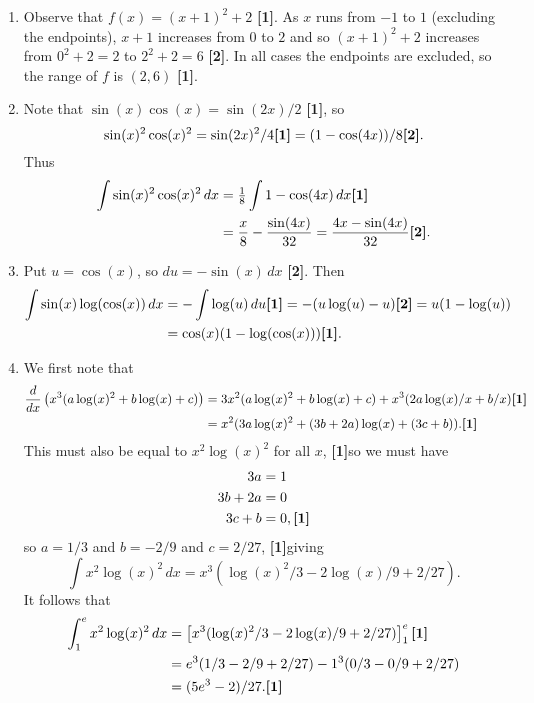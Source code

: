 \documentclass{amsart}
\renewcommand{\:}       {\colon}
\newcommand{\mks}[1]    {\mbox{\bf [#1]}}
\newcommand{\mk}        {\mbox{\bf [1]}}
\begin{document}
\begin{enumerate}
 \item %
  Observe that $f(x)=(x+1)^2+2$ \mk.  As
  $x$ runs from $-1$ to $1$ (excluding the endpoints), $x+1$ increases
  from $0$ to $2$ and so $(x+1)^2+2$ increases from $0^2+2=2$ to
  $2^2+2=6$ \mks{2}.  In all cases the endpoints are excluded, so the
  range of $f$ is $(2,6)$ \mk.

 \item %
  Note that $\sin(x)\cos(x)=\sin(2x)/2$ \mk, so
  \[ \sin(x)^2\cos(x)^2 = \sin(2x)^2/4 \mk = (1-\cos(4x))/8 \mks{2}.
  \]
  Thus
  \begin{align*}
   \int \sin(x)^2\cos(x)^2\, dx &=
    \tfrac{1}{8} \int 1-\cos(4x)\, dx \mk \\
    &= \frac{x}{8} - \frac{\sin(4x)}{32} = \frac{4x-\sin(4x)}{32} \mks{2}.
  \end{align*}

 \item %
  Put $u=\cos(x)$, so $du=-\sin(x)\,dx$ \mks{2}.  Then
  \begin{align*}
   \int\sin(x)\log(\cos(x))\,dx &= 
    -\int \log(u)\,du \mk = -(u\log(u)-u) \mks{2} = u (1 - \log(u)) \\
    &= \cos(x)(1 - \log(\cos(x))) \mk.
  \end{align*}

 \item %
  We first note that
  \begin{align*}
   \frac{d}{dx}\left(x^3(a\log(x)^2 + b\log(x) + c)\right) 
    &= 3x^2(a\log(x)^2 + b\log(x) + c) + 
       x^3(2a\log(x)/x+b/x)  \mk \\
    &= x^2(3a\log(x)^2 + (3b+2a)\log(x) + (3c+b)). \mk
  \end{align*}
  This must also be equal to $x^2\log(x)^2$ for all $x$, \mk so we must
  have  
  \begin{align*}
   3a &= 1 \\
   3b+2a &= 0 \\
   3c+b &= 0, \mk
  \end{align*}
  so $a=1/3$ and $b=-2/9$ and $c=2/27$,  \mk giving
  \[ \int x^2\log(x)^2\,dx = x^3(\log(x)^2/3-2\log(x)/9+2/27). \]
  It follows that 
  \begin{align*}
   \int_1^e x^2\log(x)^2\, dx &= 
    \left[ x^3(\log(x)^2/3-2\log(x)/9+2/27) \right]_1^e  \mk\\
   &= e^3(1/3-2/9+2/27) - 1^3(0/3-0/9+2/27) \\
   &= (5e^3 - 2)/27. \mk
  \end{align*}


\end{enumerate}
\end{document}
